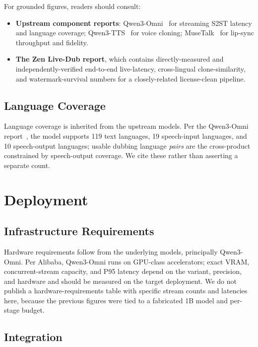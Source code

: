 \documentclass[11pt,a4paper]{article}
\begin{document}
For grounded figures, readers should consult:
\begin{itemize}
  \item \textbf{Upstream component reports}: Qwen3-Omni~\cite{qwen3omni} for streaming
        S2ST latency and language coverage; Qwen3-TTS~\cite{qwen3tts} for voice
        cloning; MuseTalk~\cite{musetalk} for lip-sync throughput and fidelity.
  \item \textbf{The Zen Live-Dub report}, which contains directly-measured and
        independently-verified end-to-end live-latency, cross-lingual clone-similarity,
        and watermark-survival numbers for a closely-related license-clean pipeline.
\end{itemize}

\subsection{Language Coverage}

Language coverage is inherited from the upstream models. Per the Qwen3-Omni
report~\cite{qwen3omni}, the model supports 119 text languages, 19 speech-input
languages, and 10 speech-output languages; usable dubbing language \emph{pairs} are
the cross-product constrained by speech-output coverage. We cite these rather than
asserting a separate count.

\section{Deployment}

\subsection{Infrastructure Requirements}

Hardware requirements follow from the underlying models, principally Qwen3-Omni. Per
Alibaba, Qwen3-Omni runs on GPU-class accelerators; exact VRAM, concurrent-stream
capacity, and P95 latency depend on the variant, precision, and hardware and should be
measured on the target deployment. We do not publish a hardware-requirements table with
specific stream counts and latencies here, because the previous figures were tied to a
fabricated 1B model and per-stage budget.

\subsection{Integration}
\end{document}
